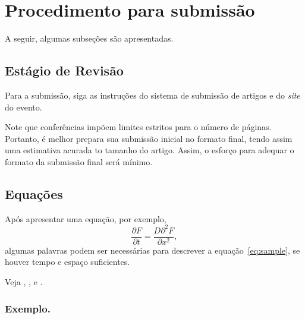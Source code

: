 \section{Procedimento para submissão}

A seguir, algumas subseções são apresentadas. 

\subsection{Estágio de Revisão}

Para a submissão, siga as instruções do sistema de submissão de artigos e do
{\em site} do evento. 


Note que conferências impõem limites estritos para o número de páginas.
Portanto, é melhor prepara sua submissão inicial no formato final, 
tendo assim uma estimativa acurada to tamanho do artigo. Assim, o
esforço para adequar o formato da submissão final será mínimo. 


\subsection{Equações}



Após apresentar uma equação, por exemplo, 
\begin{equation} \label{eq:sample}
\frac{\partial F}{\partial t} = \frac{D \partial^2 F}{\partial x^2}, 
\end{equation}
algumas palavras podem ser necessárias para descrever a equação~\eqref{eq:sample},
se houver tempo e espaço suficientes. 


Veja \cite{Abl:56}, \cite{AbTaRu:54}, \cite{Keo:58} e \cite{Pow:85}. 

\subsubsection{Exemplo.} 

